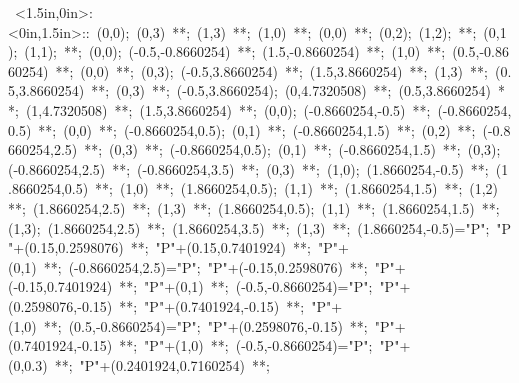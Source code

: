 
% 

\hbox{
\xy    <1.5in,0in>:<0in,1.5in>::
       (0,0); (0,3) **\dir{-}; (1,3) **\dir{-}; (1,0) **\dir{-}; 
       (0,0) **\dir{-}; (0,2); (1,2); **\dir{-}; (0,1); (1,1); **\dir{-};
       (0,0); (-0.5,-0.8660254) **\dir{-}; (1.5,-0.8660254) **\dir{-}; 
       (1,0) **\dir{-}; (0.5,-0.8660254) **\dir{-}; (0,0) **\dir{-};
       (0,3); (-0.5,3.8660254) **\dir{-}; (1.5,3.8660254) **\dir{-}; 
       (1,3) **\dir{-}; (0.5,3.8660254) **\dir{-}; (0,3) **\dir{-};
       (-0.5,3.8660254); (0,4.7320508) **\dir{-}; (0.5,3.8660254) **\dir{-}; 
       (1,4.7320508) **\dir{-}; (1.5,3.8660254) **\dir{-};
       (0,0); (-0.8660254,-0.5) **\dir{-}; 
       (-0.8660254,0.5) **\dir{-}; (0,0) **\dir{-}; 
         (-0.8660254,0.5); (0,1) **\dir{-}; (-0.8660254,1.5) **\dir{-}; 
         (0,2) **\dir{-}; (-0.8660254,2.5) **\dir{-}; (0,3) **\dir{-}; 
         (-0.8660254,0.5); (0,1) **\dir{-}; (-0.8660254,1.5) **\dir{-}; 
       (0,3); (-0.8660254,2.5) **\dir{-}; 
       (-0.8660254,3.5) **\dir{-}; (0,3) **\dir{-}; 
       (1,0); (1.8660254,-0.5) **\dir{-}; 
       (1.8660254,0.5) **\dir{-}; (1,0) **\dir{-}; 
         (1.8660254,0.5); (1,1) **\dir{-}; (1.8660254,1.5) **\dir{-}; 
         (1,2) **\dir{-}; (1.8660254,2.5) **\dir{-}; (1,3) **\dir{-}; 
         (1.8660254,0.5); (1,1) **\dir{-}; (1.8660254,1.5) **\dir{-}; 
       (1,3); (1.8660254,2.5) **\dir{-}; 
       (1.8660254,3.5) **\dir{-}; (1,3) **\dir{-}; 
         (1.8660254,-0.5)="P"; "P"+(0.15,0.2598076) **\dir{-};  
               "P"+(0.15,0.7401924) **\dir{-}; "P"+(0,1) **\dir{-};
         (-0.8660254,2.5)="P"; "P"+(-0.15,0.2598076) **\dir{-};  
               "P"+(-0.15,0.7401924) **\dir{-}; "P"+(0,1) **\dir{-};
         (-0.5,-0.8660254)="P"; "P"+(0.2598076,-0.15) **\dir{-};  
               "P"+(0.7401924,-0.15) **\dir{-}; "P"+(1,0) **\dir{-};
         (0.5,-0.8660254)="P"; "P"+(0.2598076,-0.15) **\dir{-};  
               "P"+(0.7401924,-0.15) **\dir{-}; "P"+(1,0) **\dir{-};
         (-0.5,-0.8660254)="P"; "P"+(0,0.3) **\dir{-}; 
                "P"+(0.2401924,0.7160254) **\dir{-};
}
